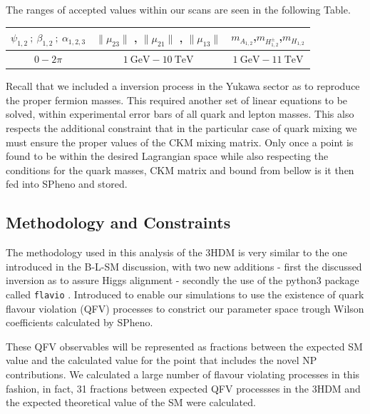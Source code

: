 The ranges of accepted values within our scans are seen in the following Table.
%
\begin{table}[H]
\centering
\begin{tabular}{ccc}
$\psi_{1,2} \ ; \ \beta_{1,2} \ ;\  \alpha_{1,2,3}$ & $\|\mu_{23}\|$ , $\|\mu_{21}\|$ , $\|\mu_{13}\|$ &  $m_{A_{1,2}}$,$m_{H_{1,2}^\pm}$,$m_{H_{1,2}}$ \\ \hline
$0- 2\pi$    & $1 \ \text{GeV} - 10 \ \text{TeV}$ & $1 \ \text{GeV} - 11 \ \text{TeV}$   
\end{tabular}
\end{table}

Recall that we included a inversion process in the Yukawa sector as to reproduce the proper fermion masses. 
% 
This required another set of linear equations to be solved, within experimental error bars of all quark and lepton masses.
% 
This also respects the additional constraint that in the particular case of quark mixing we must ensure the proper values of the CKM mixing matrix.  
%
Only once a point is found to be within the desired Lagrangian space while also respecting the conditions for the quark masses, CKM matrix and bound from bellow is it then fed into SPheno and stored. 
%
\subsection{Methodology and Constraints}

The  methodology used in this analysis of the 3HDM is very similar to the one introduced in the B-L-SM discussion, with two new additions - first the discussed inversion as to assure Higgs alignment - secondly the use of the python3 package called \texttt{flavio}  \cite{straub2018flavio}. 
%
Introduced to enable our simulations to use the existence of quark flavour violation (QFV) processes to constrict our parameter space trough  Wilson coefficients calculated by SPheno. 

These QFV observables will be represented as fractions between the expected SM value and the calculated value for the point that includes the novel NP contributions. 
%
We calculated a large number of flavour violating processes in this fashion, in fact, 31 fractions between expected QFV processses in the 3HDM and the expected theoretical value of the SM were calculated. 
%

